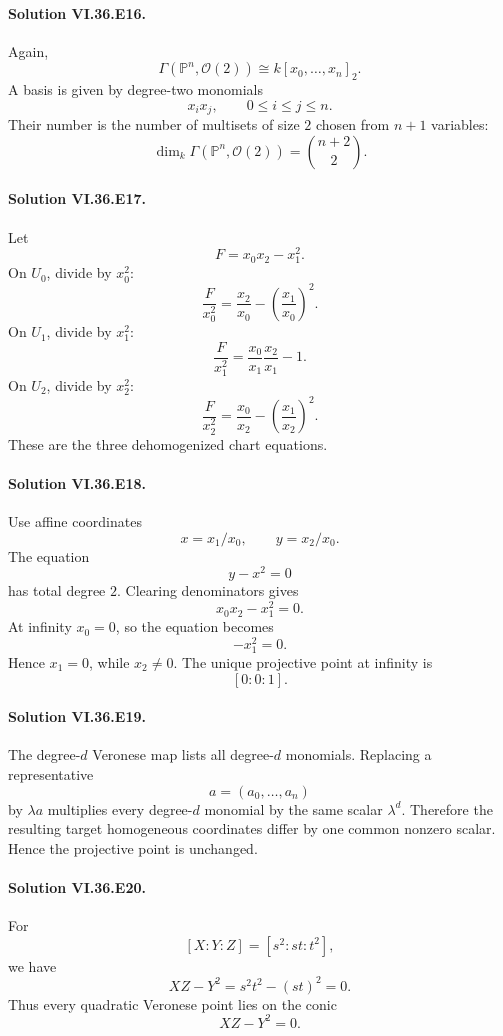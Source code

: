\paragraph{Solution VI.36.E16.}
Again,
\[
\Gamma(\mathbb P^n,\mathcal O(2))
\cong
k[x_0,\ldots,x_n]_2.
\]
A basis is given by degree-two monomials
\[
x_ix_j,\qquad 0\le i\le j\le n.
\]
Their number is the number of multisets of size \(2\) chosen from \(n+1\) variables:
\[
\boxed{
\dim_k\Gamma(\mathbb P^n,\mathcal O(2))
=
\binom{n+2}{2}.
}
\]

\paragraph{Solution VI.36.E17.}
Let
\[
F=x_0x_2-x_1^2.
\]
On \(U_0\), divide by \(x_0^2\):
\[
\frac{F}{x_0^2}
=
\frac{x_2}{x_0}
-
\left(\frac{x_1}{x_0}\right)^2.
\]
On \(U_1\), divide by \(x_1^2\):
\[
\frac{F}{x_1^2}
=
\frac{x_0}{x_1}\frac{x_2}{x_1}-1.
\]
On \(U_2\), divide by \(x_2^2\):
\[
\frac{F}{x_2^2}
=
\frac{x_0}{x_2}
-
\left(\frac{x_1}{x_2}\right)^2.
\]
These are the three dehomogenized chart equations.

\paragraph{Solution VI.36.E18.}
Use affine coordinates
\[
x=x_1/x_0,
\qquad
y=x_2/x_0.
\]
The equation
\[
y-x^2=0
\]
has total degree \(2\). Clearing denominators gives
\[
\boxed{x_0x_2-x_1^2=0}.
\]
At infinity \(x_0=0\), so the equation becomes
\[
-x_1^2=0.
\]
Hence \(x_1=0\), while \(x_2\neq0\). The unique projective point at infinity is
\[
\boxed{[0:0:1]}.
\]

\paragraph{Solution VI.36.E19.}
The degree-\(d\) Veronese map lists all degree-\(d\) monomials. Replacing a representative
\[
a=(a_0,\ldots,a_n)
\]
by \(\lambda a\) multiplies every degree-\(d\) monomial by the same scalar \(\lambda^d\). Therefore the resulting
target homogeneous coordinates differ by one common nonzero scalar. Hence the projective point is unchanged.

\paragraph{Solution VI.36.E20.}
For
\[
[X:Y:Z]=[s^2:st:t^2],
\]
we have
\[
XZ-Y^2
=
s^2t^2-(st)^2
=
0.
\]
Thus every quadratic Veronese point lies on the conic
\[
\boxed{XZ-Y^2=0}.
\]


